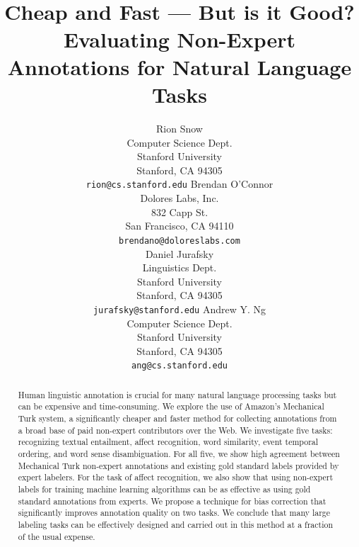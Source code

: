 \documentclass[11pt]{article}
\title{\ \\ \ \\ %
Cheap and Fast  ---  But is it Good?\\Evaluating Non-Expert Annotations for Natural Language Tasks }
\author{Rion Snow\\
Computer Science Dept.\\
Stanford University \\
Stanford, CA 94305 \\
\small{\tt rion@cs.stanford.edu}
\And Brendan O'Connor\\
Dolores Labs, Inc.\\
832 Capp St.\\
San Francisco, CA 94110 \\
\small{\tt brendano@doloreslabs.com} \\
\And Daniel Jurafsky\\
Linguistics Dept.\\
Stanford University\\
Stanford, CA 94305 \\
\small{\tt jurafsky@stanford.edu}
\And Andrew Y. Ng\\
Computer Science Dept.\\
Stanford University \\
Stanford, CA 94305 \\
\small{\tt ang@cs.stanford.edu} }
\newlength{\abstractReduceTop}
\begin{document}
\maketitle

\vspace*{\abstractReduceTop}
\begin{abstract}
\small{Human linguistic annotation is crucial for many natural
language processing tasks but can be expensive and time-consuming.
We explore the use of Amazon's Mechanical Turk system, a significantly cheaper and faster method for collecting annotations from a broad base of paid non-expert contributors over the Web.  We investigate five tasks:  recognizing textual entailment, affect recognition, word similarity,
event temporal ordering, and word sense disambiguation.
For all five, we show high agreement between Mechanical Turk non-expert annotations
and existing gold standard labels provided by expert labelers.  
For the task of affect recognition, we also show that using non-expert
labels for training machine learning algorithms can be as effective
as using gold standard annotations from experts.  We propose a technique for bias correction that significantly improves annotation quality on two tasks.  We conclude that 
many large labeling tasks can be effectively designed and carried
out in this method at a fraction of the usual expense.}



\end{abstract}
\end{document}
